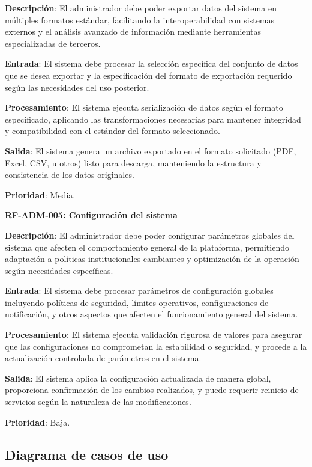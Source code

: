 \documentclass[12pt,a4paper,oneside]{report}
\begin{document}
\textbf{Descripción}: El administrador debe poder exportar datos del sistema en múltiples formatos estándar, facilitando la interoperabilidad con sistemas externos y el análisis avanzado de información mediante herramientas especializadas de terceros.

\textbf{Entrada}: El sistema debe procesar la selección específica del conjunto de datos que se desea exportar y la especificación del formato de exportación requerido según las necesidades del uso posterior.

\textbf{Procesamiento}: El sistema ejecuta serialización de datos según el formato especificado, aplicando las transformaciones necesarias para mantener integridad y compatibilidad con el estándar del formato seleccionado.

\textbf{Salida}: El sistema genera un archivo exportado en el formato solicitado (PDF, Excel, CSV, u otros) listo para descarga, manteniendo la estructura y consistencia de los datos originales.

\textbf{Prioridad}: Media.

\textbf{RF-ADM-005: Configuración del sistema}

\textbf{Descripción}: El administrador debe poder configurar parámetros globales del sistema que afecten el comportamiento general de la plataforma, permitiendo adaptación a políticas institucionales cambiantes y optimización de la operación según necesidades específicas.

\textbf{Entrada}: El sistema debe procesar parámetros de configuración globales incluyendo políticas de seguridad, límites operativos, configuraciones de notificación, y otros aspectos que afecten el funcionamiento general del sistema.

\textbf{Procesamiento}: El sistema ejecuta validación rigurosa de valores para asegurar que las configuraciones no comprometan la estabilidad o seguridad, y procede a la actualización controlada de parámetros en el sistema.

\textbf{Salida}: El sistema aplica la configuración actualizada de manera global, proporciona confirmación de los cambios realizados, y puede requerir reinicio de servicios según la naturaleza de las modificaciones.

\textbf{Prioridad}: Baja.

\subsection{Diagrama de casos de uso}\label{diagrama-de-casos-de-uso}
\end{document}
